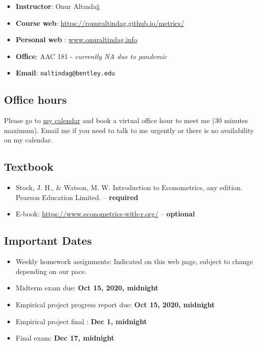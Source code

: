 \documentclass[
]{book}
\providecommand{\tightlist}{%
  \setlength{\itemsep}{0pt}\setlength{\parskip}{0pt}}
\begin{document}
\begin{itemize}
\tightlist
\item
  \textbf{Instructor}: Onur Altındağ
\item
  \textbf{Course web}: \url{https://ronuraltindag.github.io/metrics/}
\item
  \textbf{Personal web} : \href{https://www.onuraltindag.info/}{www.onuraltindag.info}
\item
  \textbf{Office}: AAC 181 - \emph{currently NA due to pandemic}
\item
  \textbf{Email}: \texttt{oaltindag@bentley.edu}
\end{itemize}

\hypertarget{office-hours}{%
\subsection*{Office hours}\label{office-hours}}

Please go to \href{https://calendly.com/ronuraltindag/ec282?month=2020-08}{my calendar} and book a virtual office hour to meet me (30 minutes maximum). Email me if you need to talk to me urgently or there is no availability on my calendar.

\hypertarget{textbook}{%
\subsection*{Textbook}\label{textbook}}

\begin{itemize}
\tightlist
\item
  Stock, J. H., \& Watson, M. W. Introduction to Econometrics, any edition. Pearson Education Limited. -- \textbf{required}
\item
  E-book: \url{https://www.econometrics-with-r.org/} -- \textbf{optional}
\end{itemize}

\hypertarget{important-dates}{%
\subsection*{Important Dates}\label{important-dates}}

\begin{itemize}
\tightlist
\item
  Weekly homework assignments: Indicated on this web page, subject to change depending on our pace.\\
\item
  Midterm exam due: \textbf{Oct 15, 2020, midnight}\\
\item
  Empirical project progress report due: \textbf{Oct 15, 2020, midnight}
\item
  Empirical project final : \textbf{Dec 1, midnight}
\item
  Final exam: \textbf{Dec 17, midnight}
\end{itemize}
\end{document}
